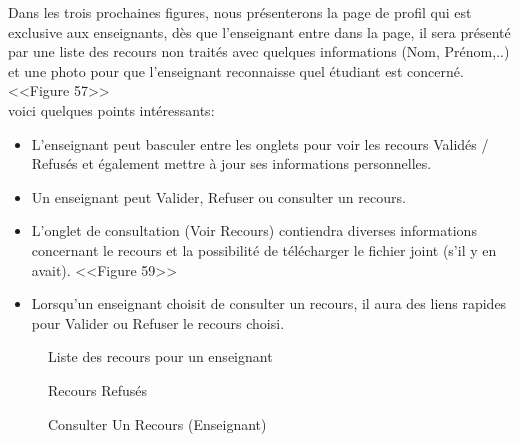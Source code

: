 \documentclass[12pt]{report}
\begin{document}
Dans les trois prochaines figures, nous présenterons la page de profil qui est exclusive aux enseignants, dès que l'enseignant entre dans la page, il sera présenté par une liste des recours non traités avec quelques informations (Nom, Prénom,..) et une photo pour que l'enseignant reconnaisse quel étudiant est concerné. <<Figure 57>>
\\
voici quelques points intéressants:

\vspace{-0.05in}
\begin{itemize}
  \item L'enseignant peut basculer entre les onglets pour voir les recours Validés / Refusés et également mettre à jour ses informations personnelles.
  \item Un enseignant peut Valider, Refuser ou consulter un recours.
  \item L'onglet de consultation (Voir Recours) contiendra diverses informations concernant le recours et la possibilité de télécharger le fichier joint (s'il y en avait). <<Figure 59>>
  \item Lorsqu'un enseignant choisit de consulter un recours, il aura des liens rapides pour Valider ou Refuser le recours choisi.
\end{itemize}

\vspace{0.08in}

\begin{figure}[h]
\centering
  \hspace*{-0.33in}
\caption{Liste des recours pour un enseignant}
\end{figure}
\vspace*{-0.2in}

\newpage

\begin{figure}[H]
\centering
  \vspace*{-0.3in}
  \hspace*{-0.1in}
\caption{Recours Refusés}
\end{figure}

\begin{figure}[H]
\centering
  \vspace*{0.05in}
  \hspace*{-0.1in}
  \caption{Consulter Un Recours (Enseignant)}
  \vspace*{-0.1in}
\end{figure}
\end{document}
